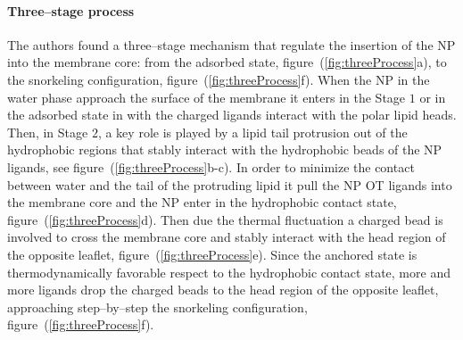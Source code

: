 \paragraph{\textbf{Three--stage process}} The authors found a three--stage mechanism that regulate the insertion of the \ac{NP} into the membrane core: from the adsorbed state, figure~(\ref{fig:threeProcess}a), to the snorkeling configuration, figure~(\ref{fig:threeProcess}f). When the \ac{NP} in the water phase approach the surface of the membrane it enters in the Stage $1$ or in the adsorbed state in with the charged ligands interact with the polar lipid heads. Then, in Stage $2$, a key role is played by a lipid tail protrusion out of the hydrophobic regions that stably interact with the hydrophobic beads of the \ac{NP} ligands, see figure~(\ref{fig:threeProcess}b-c). In order to minimize the contact between water and the tail of the protruding lipid it pull the \ac{NP} \ac{OT} ligands into the membrane core and the \ac{NP} enter in the hydrophobic contact state, figure~(\ref{fig:threeProcess}d). Then due the thermal fluctuation a charged bead is involved to cross the membrane core and stably interact with the head region of the opposite leaflet, figure~(\ref{fig:threeProcess}e). Since the anchored state is thermodynamically favorable respect to the hydrophobic contact state, more and more ligands drop the charged beads to the head region of the opposite leaflet, approaching step--by--step the snorkeling configuration, figure~(\ref{fig:threeProcess}f).
